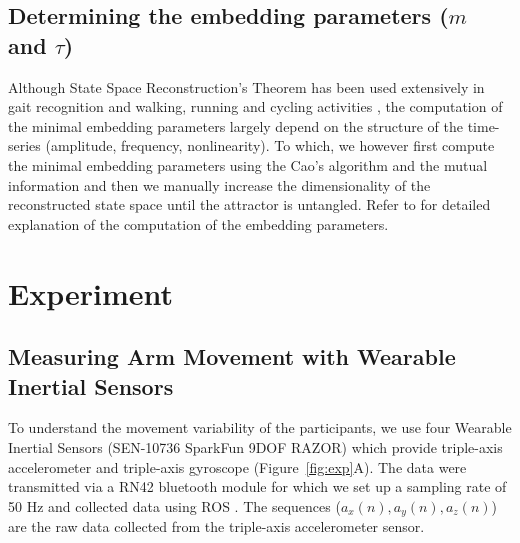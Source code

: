 \documentclass{sigchi}
\begin{document}


\subsection{Determining the embedding parameters ($m$ and $\tau$)}
Although State Space Reconstruction's Theorem has been used extensively in gait
recognition and walking, running and cycling activities \cite{Frank2010,Sama2013},
the computation of the minimal embedding parameters largely depend on the
structure of the time-series (amplitude, frequency, nonlinearity).
To which, we however first compute the minimal embedding parameters
using the Cao's algorithm \cite{Cao1997} and the mutual information
and then we manually increase the dimensionality of the reconstructed state
space until the attractor is untangled. Refer to \cite{Cao1997}
for detailed explanation of the computation of the embedding parameters.

\section{Experiment}

\subsection{Measuring Arm Movement with Wearable Inertial Sensors}
To understand the movement variability of the participants, we use
four Wearable Inertial Sensors (SEN-10736 SparkFun 9DOF RAZOR)
which provide triple-axis accelerometer and triple-axis gyroscope (Figure~\ref{fig:exp}A).
The data were transmitted via a RN42 bluetooth module for which we set up a
sampling rate of 50 Hz and collected data using ROS \cite{quigley2009}.
The sequences ($a_x(n),a_y(n),a_z(n)$) are the raw data collected from the
triple-axis accelerometer sensor.
\end{document}
